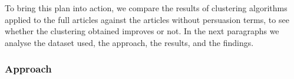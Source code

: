 






To bring this plan into action, we compare the results of  clustering algorithms applied to the full articles against the articles without persuasion terms, to see whether the clustering obtained improves or not.
In the next paragraphs we analyse the dataset used, the approach, the results, and the findings.






\subsubsection{Approach}

